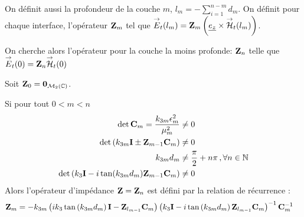         On définit aussi la profondeur de la couche $m$, $l_m = -\sum_{i=1}^{n-m} d_{m} $. 
        On définit pour chaque interface, l'opérateur $\mathbf{Z}_m$ tel que ${\overset{\rightarrow}{E}}_t(l_m) = \mathbf{Z}_m \left(\underline{e_z} \times {\overset{\rightarrow}{\mathcal{H}}}_t(l_m)\right)$. 

        On cherche alors l'opérateur pour la couche la moins profonde: $\mathbf{Z}_n$ telle que ${\overset{\rightarrow}{E}}_t(0) = \mathbf{Z}_n{\overset{\rightarrow}{\mathcal{H}}}_t(0)$

        \begin{thm}
            Soit $\mathbf{Z}_0 = \mathbf{0}_{\mathcal{M}_2(\mathbb C)}$.

            Si pour tout $0<m < n$
                \begin{align}
                \det{\mathbf{C}_m} = \dfrac{k_{3m}\epsilon_m^2}{\mu_m^2} &\not = 0 \\
                \det\left(k_{3m}\mathbf{I} \pm \mathbf{Z}_{m-1}\mathbf{C}_m \right) &\not = 0 \\
                k_{3m}d_m &\not = \dfrac{\pi}{2}+n\pi\,, \forall n \in \mathbb N \\
                \det\left(k_3\mathbf{I} - i\tan(k_{3m}d_m)\mathbf{Z}_{m-1}\mathbf{C}_m\right) &\not = 0
            \end{align}
            Alors l'opérateur d'impédance $\mathbf{Z} =  \mathbf{Z}_n$ est défini par la relation de récurrence : 
            \begin{align}
            \mathbf{Z}_m &= -k_{3m}
            \left(ik_3\tan\left(k_{3m}d_m\right)\mathbf{I} - \mathbf{Z}_{l_{m-1}}\mathbf{C}_m\right)
            \left(k_3\mathbf{I} - i\tan\left(k_{3m}d_m\right)\mathbf{Z}_{l_{m-1}}\mathbf{C}_m\right)^{-1}
            \mathbf{C}_m^{-1}
            \end{align}
        \end{thm}

